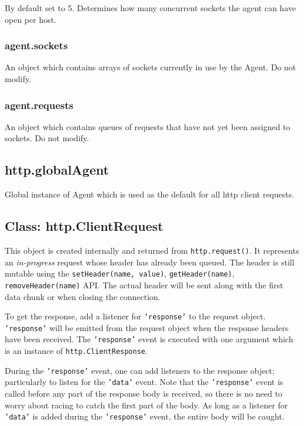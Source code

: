 By default set to 5. Determines how many concurrent sockets the agent
can have open per host.

\subsubsection{agent.sockets}

An object which contains arrays of sockets currently in use by the
Agent. Do not modify.

\subsubsection{agent.requests}

An object which contains queues of requests that have not yet been
assigned to sockets. Do not modify.

\subsection{http.globalAgent}

Global instance of Agent which is used as the default for all http
client requests.

\subsection{Class: http.ClientRequest}

This object is created internally and returned from
\texttt{http.request()}. It represents an \emph{in-progress} request
whose header has already been queued. The header is still mutable using
the \texttt{setHeader(name, value)}, \texttt{getHeader(name)},
\texttt{removeHeader(name)} API. The actual header will be sent along
with the first data chunk or when closing the connection.

To get the response, add a listener for \texttt{'response'} to the
request object. \texttt{'response'} will be emitted from the request
object when the response headers have been received. The
\texttt{'response'} event is executed with one argument which is an
instance of \texttt{http.ClientResponse}.

During the \texttt{'response'} event, one can add listeners to the
response object; particularly to listen for the \texttt{'data'} event.
Note that the \texttt{'response'} event is called before any part of the
response body is received, so there is no need to worry about racing to
catch the first part of the body. As long as a listener for
\texttt{'data'} is added during the \texttt{'response'} event, the
entire body will be caught.

